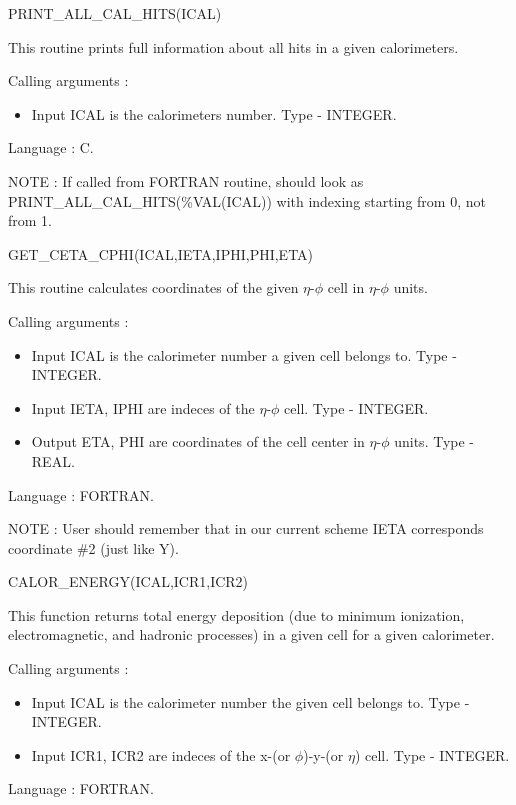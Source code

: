\bigskip

\begin{center}
PRINT\_ALL\_CAL\_HITS(ICAL)
\end{center}

This routine prints full information about all hits in a given calorimeters.

Calling arguments :
\begin{itemize}
\item {Input ICAL is the calorimeters number. Type - INTEGER.}
\end{itemize}

Language : C.

NOTE : If called from FORTRAN routine, should look as \\
PRINT\_ALL\_CAL\_HITS(\%VAL(ICAL)) with indexing starting from 0, not from 1. 


\begin{center}
GET\_CETA\_CPHI(ICAL,IETA,IPHI,PHI,ETA)
\end{center}

This routine calculates coordinates of the given $\eta$-$\phi$ cell in $\eta$-$\phi$
units.

Calling arguments :
\begin{itemize}
\item {Input ICAL is the calorimeter number a given cell belongs to. Type - INTEGER.}
\item {Input IETA, IPHI are indeces of the $\eta$-$\phi$ cell. Type - INTEGER.}
\item {Output ETA, PHI are coordinates of the cell center in $\eta$-$\phi$ units.
Type - REAL.}
\end{itemize}

Language : FORTRAN.

NOTE : User should remember that in our current scheme IETA corresponds coordinate \#2 
(just like Y).


\begin{center}
CALOR\_ENERGY(ICAL,ICR1,ICR2)
\end{center}

This function returns total energy deposition (due to minimum ionization, 
electromagnetic, and hadronic processes) in a given cell for a given calorimeter.

Calling arguments :
\begin{itemize}
\item {Input ICAL is the calorimeter number the given cell belongs to. Type - INTEGER.}
\item {Input ICR1, ICR2 are indeces of the x-(or $\phi$)-y-(or $\eta$) cell. Type - INTEGER.}
\end{itemize}

Language : FORTRAN.


